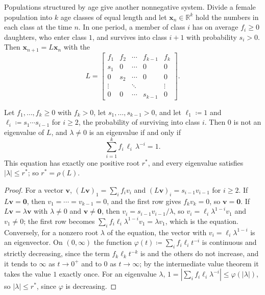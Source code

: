 Populations structured by age give another nonnegative system. Divide a female population into $k$ age classes of equal length and let $\mathbf x_n\in\mathbb R^k$ hold the numbers in each class at the time $n$. In one period, a member of class $i$ has on average $f_i\ge0$ daughters, who enter class $1$, and survives into class $i+1$ with probability $s_i>0$. Then $\mathbf x_{n+1}=L\mathbf x_n$ with the ~\cite{leslie1945}
\[
L=\begin{bmatrix}f_1&f_2&\cdots&f_{k-1}&f_k\\s_1&0&\cdots&0&0\\0&s_2&\cdots&0&0\\\vdots&&\ddots&&\vdots\\0&0&\cdots&s_{k-1}&0\end{bmatrix}.
\]

\begin{proposition}
\label{prop:leslie}
Let $f_1,\ldots,f_k\ge0$ with $f_k>0$, let $s_1,\ldots,s_{k-1}>0$, and let $\ell_1\coloneqq1$ and $\ell_i\coloneqq s_1\cdots s_{i-1}$ for $i\ge2$, the probability of surviving into class $i$. Then $0$ is not an eigenvalue of $L$, and $\lambda\ne0$ is an eigenvalue if and only if
\[
\sum_{i=1}^kf_i\,\ell_i\,\lambda^{-i}=1 .
\]
This equation has exactly one positive root $r^*$, and every eigenvalue satisfies $|\lambda|\le r^*$; so $r^*=\rho(L)$.
\end{proposition}

\begin{proof}
For a vector $\mathbf v$, $(L\mathbf v)_1=\sum_if_iv_i$ and $(L\mathbf v)_i=s_{i-1}v_{i-1}$ for $i\ge2$. If $L\mathbf v=\mathbf 0$, then $v_1=\cdots=v_{k-1}=0$, and the first row gives $f_kv_k=0$, so $\mathbf v=\mathbf 0$. If $L\mathbf v=\lambda\mathbf v$ with $\lambda\ne0$ and $\mathbf v\ne\mathbf 0$, then $v_i=s_{i-1}v_{i-1}/\lambda$, so $v_i=\ell_i\lambda^{1-i}v_1$ and $v_1\ne0$; the first row becomes $\sum_if_i\ell_i\lambda^{1-i}v_1=\lambda v_1$, which is the equation. Conversely, for a nonzero root $\lambda$ of the equation, the vector with $v_i=\ell_i\lambda^{1-i}$ is an eigenvector. On $(0,\infty)$ the function $\varphi(t)\coloneqq\sum_if_i\ell_it^{-i}$ is continuous and strictly decreasing, since the term $f_k\ell_kt^{-k}$ is and the others do not increase, and it tends to $\infty$ as $t\to0^+$ and to $0$ as $t\to\infty$; by the intermediate value theorem it takes the value $1$ exactly once. For an eigenvalue $\lambda$, $1=|\sum_if_i\ell_i\lambda^{-i}|\le\varphi(|\lambda|)$, so $|\lambda|\le r^*$, since $\varphi$ is decreasing.
\end{proof}

